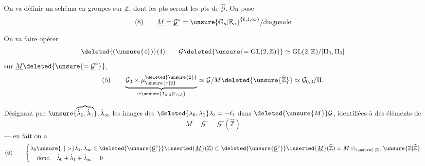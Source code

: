On va définir un schéma en groupes  sur $\mathbb{Z}$, dont les pts seront  les pts de $\widehat{\mathcal{G}}$. On pose
\[
(8)\qquad
\underline{M}=\underline{\mathcal{G}}^{\circ}
=\unsure{\mathbb{G}_a|\mathbb{E}_a}^{\{0,1,\infty\}}/\text{diagonale}
\]

On va faire opérer 
\[
\deleted{(\unsure{4})}(4)\qquad
\mathcal{G}\deleted{\unsure{=\operatorname{GL}(2,\mathbb{Z})}}
\simeq\operatorname{GL}(2,\mathbb{Z})/[\Pi_0,\Pi_0]
\]
sur $\underline{M}\deleted{\unsure{=\underline{\mathcal{G}}^{\circ}}}$,
 
\[
(5)\qquad
\underbrace{\mathcal{G}_3\times\mu_{\unsure{\tau|2}}^{\deleted{\unsure{2}}}}_{\simeq\unsure{T_{0,3}|\Gamma_{0,3}}}
\simeq\mathcal{G}/M\deleted{\unsure{\widehat{\mathbb{Z}}}}
\simeq\mathcal{G}_{0,3}/\Pi.
\]

Désignant par $\unsure{\overbrace{\dot{\lambda}_0,\dot{\lambda}_1}},\dot{\lambda}_\infty$ les images des
$\deleted{\lambda_0,\lambda_1}\lambda_i=-\ell_i$ dans $\deleted{\unsure{M}}\mathcal{G}$, identifiées à des éléments de
\[
M=\mathcal{G}^{\circ}=\underline{\mathcal{G}}^{\circ}(\widehat{\mathbb{Z}})
\]
--- en fait on a
\[
(6)\qquad
\left\{
\begin{aligned}
\dot{\lambda}_0\unsure{,|>}\dot{\lambda}_1,\dot{\lambda}_\infty
&\in\deleted{\unsure{\underline{\mathcal{G}}^{\circ}}}\inserted{\underline{M}}(\mathbb{Z})
\subset\deleted{\unsure{\underline{\mathcal{G}}^{\circ}}}\inserted{\underline{M}}(\widehat{\mathbb{Z}})
=M\otimes_{\unsure{\cdot|\mathbb{Z}}}\unsure{\mathbb{Z}|\widehat{\mathbb{Z}}}\\
\text{donc,}\quad\dot{\lambda}_0+\dot{\lambda}_1+\dot{\lambda}_\infty&=0
\end{aligned}\right.
\]


